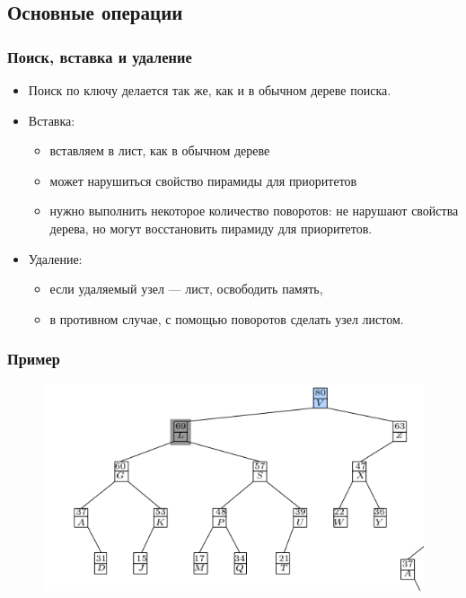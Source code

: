 \documentclass[hyperref={unicode=true}]{beamer}
\begin{document}
\subsection{Основные операции}
\frame
{
  \frametitle{Поиск, вставка и удаление}
  \begin{itemize}
    \item Поиск по ключу делается так же, как и в обычном дереве поиска.
    \item Вставка:
      \begin{itemize}
         \item вставляем в лист, как в обычном дереве
         \item может нарушиться свойство пирамиды для приоритетов
         \item нужно выполнить некоторое количество поворотов: не нарушают свойства дерева, но могут восстановить пирамиду для приоритетов.
       \end{itemize}
     \item Удаление:
       \begin{itemize}
         \item если удаляемый узел --- лист, освободить память,
         \item в противном случае, с помощью поворотов сделать узел листом.
       \end{itemize}
  \end{itemize}
}

\frame
{
  \frametitle{Пример}
  \begin{figure}[h!]
  \centerline{\includegraphics[scale=0.5]{ins1.png}}
  \end{figure}
}
\end{document}
